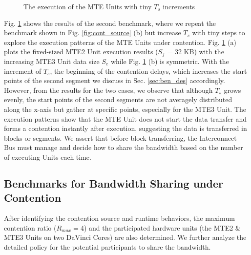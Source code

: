 \documentclass[12pt]{extbook}
\begin{document}
\begin{figure}[tbp]
    \caption{The execution of the MTE Units with tiny $T_{s}$ increments}
    \label{fig:micro_view}
    \end{figure}

Fig. \ref{fig:micro_view} shows the results of the second benchmark, where we repeat the benchmark shown in Fig. \ref{fig:cont_source} (b) but increase $T_{s}$ with tiny steps to explore the execution patterns of the MTE Units under contention. Fig. \ref{fig:micro_view} (a) plots the fixed-sized MTE2 Unit execution results ($S_f$ = 32 KB) with the increasing MTE3 Unit data size $S_e$ while Fig. \ref{fig:micro_view} (b) is symmetric. With the increment of $T_{s}$, the beginning of the contention delays, which increases the start points of the second segment we discuss in Sec. \ref{sec:ben_des} accordingly. However, from the results for the two cases, we observe that although $T_{s}$ grows evenly, the start points of the second segments are not averagely distributed along the x-axis but gather at specific points, especially for the MTE3 Unit. The execution patterns show that the MTE Unit does not start the data transfer and forms a contention instantly after execution, suggesting the data is transferred in blocks or segments. We assert that before block transferring, the Interconnect Bus must manage and decide how to share the bandwidth based on the number of executing Units each time.

\subsection{Benchmarks for Bandwidth Sharing under Contention}

After identifying the contention source and runtime behaviors, the maximum contention ratio ($R_{max} = 4$) and the participated hardware units (the MTE2 \& MTE3 Units on two DaVinci Cores) are also determined. We further analyze the detailed policy for the potential participants to share the bandwidth. 
\end{document}

